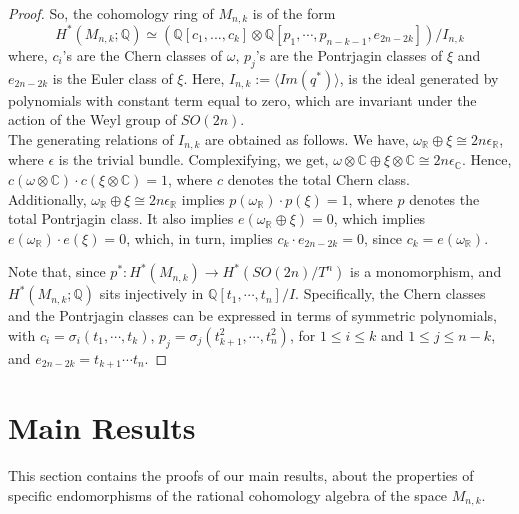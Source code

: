 \documentclass[a4paper,leqno,12pt]{amsart}
\theoremstyle{plain}
\theoremstyle{definition}
\theoremstyle{remark}
\newcommand{\R}{\mathbb{R}}
\newcommand{\Q}{\mathbb{Q}}
\newcommand{\C}{\mathbb{C}}
\begin{document}
{\begin{proof}
\noindent
So, the cohomology ring of $M_{n,k}$ is of the form 
\begin{displaymath}
 H^{*}(M_{n,k}; \Q ) \simeq( \Q [c_{1},...,c_{k}] \otimes \Q [p_{1}, \cdots ,p_{n-k-1},e_{2n-2k}]) /I_{n,k}
\end{displaymath}
\noindent
 where,  $c_{i}$'s are the Chern classes of $\omega$,  $p_{j}$'s are the Pontrjagin classes of $\xi$ and $e_{2n-2k}$ is the Euler class of $\xi$.
  \noindent
 Here,  $I_{n,k} := \langle Im (q^{*}) \rangle $,  is the ideal generated by polynomials with constant term equal to zero,  which are invariant under the action of the Weyl group of $SO(2n)$.  \\
 \noindent
The generating relations of $I_{n,k}$ are obtained as follows.  We have,  $\omega_{\R} \oplus \xi \cong 2n \epsilon_{\R}$,  where $\epsilon$ is the trivial bundle.  Complexifying,  we get,  $\omega \otimes \C \oplus \xi \otimes \C \cong 2n \epsilon_{\C}$.  Hence,  $c(\omega \otimes \C) \cdot c(\xi \otimes \C) =1$,  where $c$ denotes the total Chern class.  \\ Additionally,  $\omega_{\R} \oplus \xi \cong 2n \epsilon_{\R} $  implies  $p(\omega_\R)\cdot  p(\xi) = 1$,  where $p$ denotes the total Pontrjagin class. 
It also implies $ e(\omega_{\R} \oplus \xi) = 0$,  which implies $e(\omega_{\R}) \cdot e(\xi) = 0$,  which,  in turn, implies $c_k \cdot e_{2n-2k} =0$,  since $c_k = e(\omega_{\R})$.  
 
 \noindent
 Note that,  since $p^{*} \colon H^{*} (M_{n,k}) \rightarrow H^{*}(SO(2n)/T^{n})$ is a monomorphism,  and $H^{*}(M_{n,k} ; \Q)$ sits injectively in $\Q[t_{1},  \cdots , t_{n}]/  I  $.  Specifically,  the Chern classes and the Pontrjagin classes can be expressed in terms of symmetric polynomials,  with $c_i = \sigma_i (t_1,  \cdots ,  t_k) $,  
$ p_j = \sigma_j (t_{k+1}^{2},  \cdots , t_{n}^{2})$,  for $1 \leq i \leq k$ and $1 \leq j \leq n-k$,  and $e_{2n-2k} = t_{k+1} \cdots t_{n}$.

\end{proof}

\vspace{0.5cm}

\section{Main Results}

\noindent
This section contains the proofs of our main results,  about the properties of specific endomorphisms of the rational cohomology algebra of the space $M_{n,k}$.  \\

}
\end{document}
